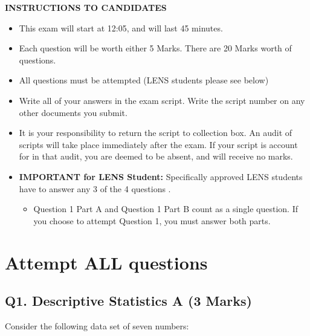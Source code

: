 \documentclass[a4paper,12pt]{article}
\begin{document}
\begin{center}
	{\bf INSTRUCTIONS TO CANDIDATES}
\end{center}
\begin{itemize} 
	\item This exam will start at 12:05, and will last 45 minutes.
	
	\item Each question will be worth either 5 Marks. There are 20 Marks worth of questions.
	\item All questions must be attempted (LENS students please see below)
	
	\item Write all of your answers in the exam script. Write the script number on any other documents you submit.
	
	\item It is your responsibility to return the script to collection box. An audit of scripts will take place immediately after the exam. If your script is account for in that audit,  you are deemed to be absent, and will receive no marks.
	
	\item \textbf{IMPORTANT for LENS Student:}
	Specifically approved LENS students have to answer any 3 of the 4 questions .
	\begin{itemize}
		\item Question 1 Part A and Question 1 Part B count as a single question. If you choose to attempt Question 1, you must answer both parts.
	\end{itemize}
	
	
\end{itemize}

\newpage
\section*{Attempt ALL questions}
\subsection*{Q1. Descriptive Statistics A (3 Marks)} %
Consider the following data set of seven numbers:
\end{document}
